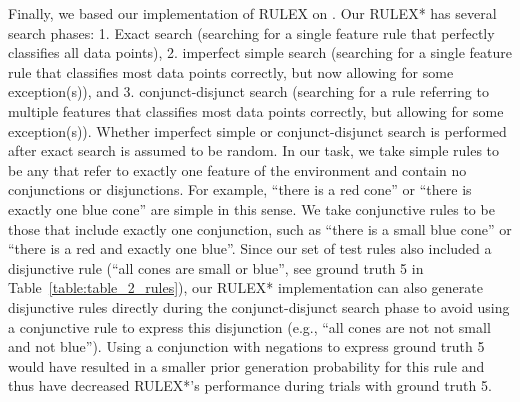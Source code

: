 \documentclass[doc,natbib,floatsintext]{apa7}
\begin{document}
Finally, we based our implementation of RULEX on \cite{navarro2005analyzing}. Our RULEX* has several search phases: 1. Exact search (searching for a single feature rule that perfectly classifies all data points), 2. imperfect simple search (searching for a single feature rule that classifies most data points correctly, but now allowing for some exception(s)), and 3. conjunct-disjunct search (searching for a rule referring to multiple features that classifies most data points correctly, but allowing for some exception(s)). Whether imperfect simple or conjunct-disjunct search is performed after exact search is assumed to be random. In our task, we take simple rules to be any that refer to exactly one feature of the environment and contain no conjunctions or disjunctions. For example, ``there is a red cone'' or ``there is exactly one blue cone'' are simple in this sense. We take conjunctive rules to be those that include exactly one conjunction, such as ``there is a small blue cone'' or ``there is a red and exactly one blue''. Since our set of test rules also included a disjunctive rule (``all cones are small or blue'', see ground truth 5 in Table~\ref{table:table_2_rules}), our RULEX* implementation can also generate disjunctive rules directly during the conjunct-disjunct search phase to avoid using a conjunctive rule to express this disjunction (e.g., ``all cones are not not small and not blue''). Using a conjunction with negations to express ground truth 5 would have resulted in a smaller prior generation probability for this rule and thus have decreased RULEX*'s performance during trials with ground truth 5.
\end{document}
